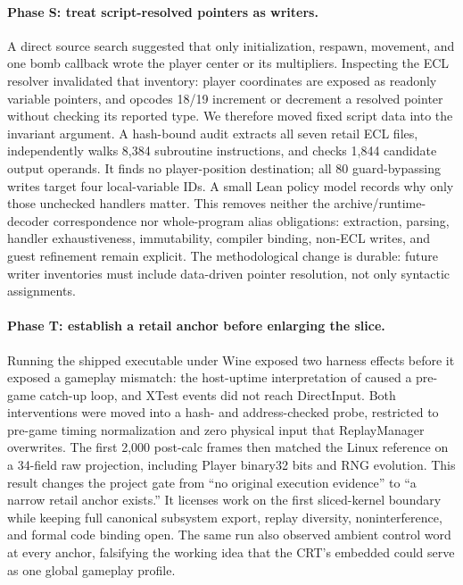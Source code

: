 \paragraph{Phase S: treat script-resolved pointers as writers.}
A direct source search suggested that only initialization, respawn, movement,
and one bomb callback wrote the player center or its multipliers.  Inspecting
the ECL resolver invalidated that inventory: player coordinates are exposed as
readonly variable pointers, and opcodes 18/19 increment or decrement a resolved
pointer without checking its reported type.  We therefore moved fixed script
data into the invariant argument.  A hash-bound audit extracts all seven retail
ECL files, independently walks 8,384 subroutine instructions, and checks 1,844
candidate output operands.  It finds no player-position destination; all 80
guard-bypassing writes target four local-variable IDs.  A small Lean policy
model records why only those unchecked handlers matter.  This removes neither
the archive/runtime-decoder correspondence nor whole-program alias obligations:
extraction, parsing, handler exhaustiveness, immutability, compiler binding,
non-ECL writes, and guest refinement remain explicit.  The methodological
change is durable: future writer inventories must include data-driven pointer
resolution, not only syntactic assignments.

\paragraph{Phase T: establish a retail anchor before enlarging the slice.}
Running the shipped executable under Wine exposed two harness effects before it
exposed a gameplay mismatch: the host-uptime interpretation of
 caused a pre-game catch-up loop, and XTest events did not
reach DirectInput.  Both interventions were moved into a hash- and
address-checked probe, restricted to pre-game timing normalization and zero
physical input that ReplayManager overwrites.  The first 2,000 post-calc frames
then matched the Linux reference on a 34-field raw projection, including Player
binary32 bits and RNG evolution.  This result changes the project gate from
``no original execution evidence'' to ``a narrow retail anchor exists.''  It
licenses work on the first sliced-kernel boundary while keeping full canonical
subsystem export, replay diversity, noninterference, and formal code binding
open.  The same run also observed ambient control word  at every
anchor, falsifying the working idea that the CRT's embedded  could
serve as one global gameplay profile.

